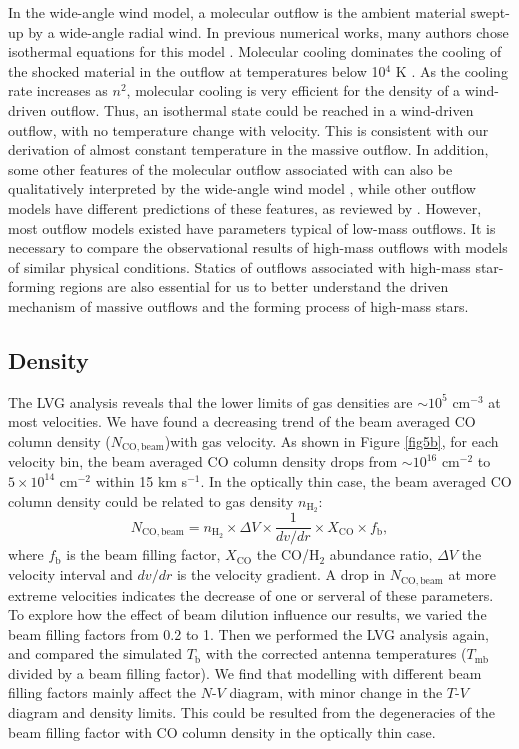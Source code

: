 In the wide-angle wind model, a molecular outflow is the ambient material swept-up by a wide-angle radial wind. In previous numerical works, many authors chose isothermal equations for this model \citep{1996ApJ...472..211L,2001ApJ...557..429L}. Molecular cooling dominates the cooling of the shocked material in the outflow at temperatures below 10$^4$ K \citep{1997IAUS..182..181H}. As the cooling rate increases as $n^2$, molecular cooling is very efficient for the density of a wind-driven outflow. Thus, an isothermal state could be reached in a wind-driven outflow, with no temperature change with velocity. This is consistent with our derivation of almost constant temperature in the massive  outflow. In addition, some other features of the molecular outflow associated with  can also be qualitatively interpreted by the wide-angle wind model \citep{2009ApJ...696...66Q}, while other outflow models have different predictions of these features, as reviewed by \citet{2007prpl.conf..245A}. However, most outflow models existed have parameters typical of low-mass outflows. It is necessary to compare the observational results of high-mass outflows with models of similar physical conditions. Statics of outflows associated with high-mass star-forming regions are also essential for us to better understand the driven mechanism of massive outflows and the forming process of high-mass stars.

\subsection{Density}

The LVG analysis reveals thal the lower limits of gas densities are $\sim 10^5$ cm$^{-3}$ at most velocities. We have found a decreasing trend of the beam averaged CO column density ($N_{\mathrm{CO,beam}}$)with gas velocity. As shown in Figure \ref{fig5b}, for each velocity bin, the beam averaged CO column density drops from $\sim 10^{16} $ cm$^{-2}$ to $5 \times 10^{14}$ cm$^{-2}$ within 15 km s$^{-1}$. In the optically thin case, the beam averaged CO column density could be related to gas density $n_{\mathrm{H}_2}$: 
\begin{equation}
N_{\mathrm{CO,beam}} = n_{\mathrm{H}_2} \times \Delta V \times \frac{1}{dv/dr} \times X_{\mathrm{CO}} \times f_{\mathrm{b}}, 
\end{equation}
where $f_{\mathrm{b}}$ is the beam filling factor, $X_{\mathrm{CO}}$ the CO/H$_2$ abundance ratio, $\Delta V$ the velocity interval and $dv/dr$ is the velocity gradient. A drop in $N_{\mathrm{CO,beam}}$ at more extreme velocities indicates the decrease of one or serveral of these parameters. 
To explore how the effect of beam dilution influence our results, we varied the beam filling factors from 0.2 to 1. Then we performed the LVG analysis again, and compared the simulated $T_\mathrm{b}$ with the corrected antenna temperatures ($T_{\mathrm{mb}}$ divided by a beam filling factor). We find that modelling with different beam filling factors mainly affect the $N$-$V$ diagram, with minor change in the $T$-$V$ diagram and density limits. This could be resulted from the degeneracies of the beam filling factor with CO column density in the optically thin case. 

